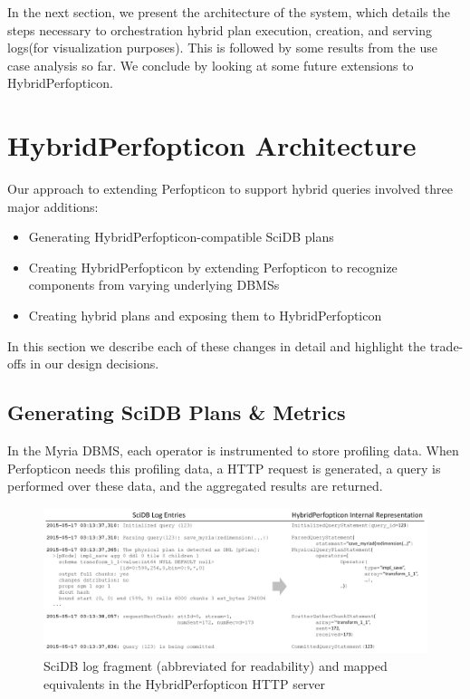 \documentclass{chi2009}
\begin{document}
In the next section, we present the architecture of the system, which details the steps necessary to orchestration hybrid plan execution, creation, and serving logs(for visualization purposes). This is followed by some results from the use case analysis so far. We conclude by looking at some future extensions to HybridPerfopticon.


\section{HybridPerfopticon Architecture}

Our approach to extending Perfopticon to support hybrid queries involved three major additions:

\begin{itemize}
\item Generating HybridPerfopticon-compatible SciDB plans
\item Creating HybridPerfopticon by extending Perfopticon to recognize components from varying underlying DBMSs
\item Creating hybrid plans and exposing them to HybridPerfopticon
\end{itemize}

In this section we describe each of these changes in detail and highlight the trade-offs in our design decisions.

\subsection{Generating SciDB Plans \& Metrics}

In the Myria DBMS, each operator is instrumented to store profiling data.  When Perfopticon needs this profiling data, a HTTP request is generated, a query is performed over these data, and the aggregated results are returned.  
\begin{figure}
\centering
\includegraphics[width=\textwidth]{log-representation.png}
\caption{SciDB log fragment (abbreviated for readability) and mapped equivalents in the HybridPerfopticon HTTP server}
\label{fig:scidb-log-example}
\end{figure}
\end{document}
